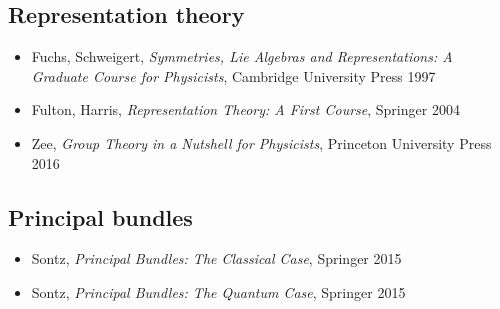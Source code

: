 \subsection*{Representation theory}

\begin{itemize}
\item Fuchs, Schweigert, \textit{Symmetries, Lie Algebras and Representations: A Graduate Course for Physicists}, Cambridge University Press 1997
\item Fulton, Harris, \textit{Representation Theory: A First Course}, Springer 2004
\item Zee, \textit{Group Theory in a Nutshell for Physicists}, Princeton University Press 2016
\end{itemize}

\subsection*{Principal bundles}

\begin{itemize}
\item Sontz, \textit{Principal Bundles: The Classical Case}, Springer 2015
\item Sontz, \textit{Principal Bundles: The Quantum Case}, Springer 2015
\end{itemize}









